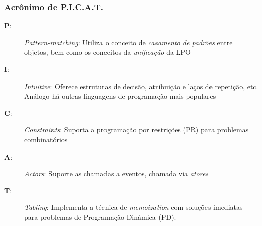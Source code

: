 \begin{frame}	 [fragile]

   \frametitle{Acrônimo de \textbf{P.I.C.A.T.}}
  
  
  \begin{block}{}
  		\begin{description}

 \item [\textbf{P}:] \textit{Pattern-matching}:  Utiliza o conceito de \textit{casamento de 
padrões} entre objetos, bem como os conceitos da \textit{unificação} da LPO

\item [\textbf{I}:] \textit{Intuitive}: Oferece estruturas de decisão, atribuição e laços de
repetição, etc. Análogo há outras linguagens de programação mais populares

\item [\textbf{C}:] \textit{Constraints}: Suporta a programação por restrições (PR) para 	
problemas combinatórios

 \item [\textbf{A}:] \textit{Actors}: Suporte as chamadas a eventos, chamada via \textit{atores}

\item [\textbf{T}:] \textit{Tabling}: Implementa a técnica de \textit{memoization} com 
soluções imediatas para problemas de Programação Dinâmica (PD).

  \end{description}	
 \end{block}
  
\end{frame}


